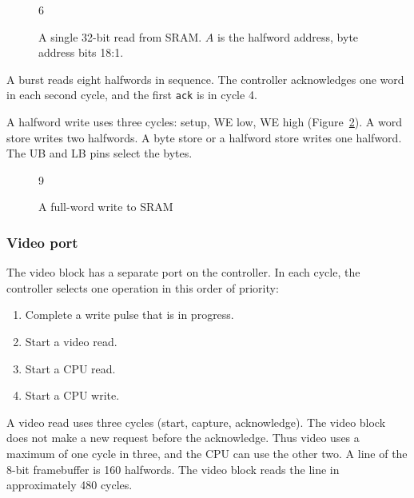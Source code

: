 \begin{figure}[H]
  \centering
  \begin{waveform}[1.0cm]{6}
    \wavesteps[cycle]
  \end{waveform}
  \caption{A single 32-bit read from SRAM. $A$ is the halfword address, byte address bits 18:1.}
  \label{fig:sramrd}
\end{figure}

A burst reads eight halfwords in sequence. The controller acknowledges one word in each second cycle, and the first \texttt{ack} is in cycle 4.

A halfword write uses three cycles: setup, WE low, WE high (Figure~\ref{fig:sramwr}). A word store writes two halfwords. A byte store or a halfword store writes one halfword. The UB and LB pins select the bytes.

\begin{figure}[H]
  \centering
  \begin{waveform}[1.0cm]{9}
    \wavesteps[cycle]
  \end{waveform}
  \caption{A full-word write to SRAM}
  \label{fig:sramwr}
\end{figure}

\subsubsection{Video port}
The video block has a separate port on the controller. In each cycle, the controller selects one operation in this order of priority:

\begin{enumerate}
  \item Complete a write pulse that is in progress.
  \item Start a video read.
  \item Start a CPU read.
  \item Start a CPU write.
\end{enumerate}

A video read uses three cycles (start, capture, acknowledge). The video block does not make a new request before the acknowledge. Thus video uses a maximum of one cycle in three, and the CPU can use the other two. A line of the 8-bit framebuffer is 160 halfwords. The video block reads the line in approximately 480 cycles.

